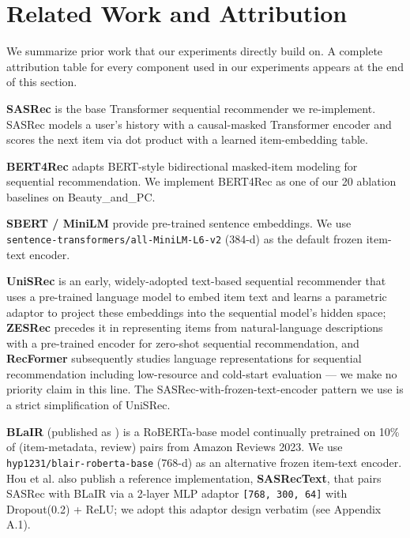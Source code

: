 \section{Related Work and Attribution}\label{sec:2}

We summarize prior work that our experiments directly build on. A complete attribution table for every component used in our experiments appears at the end of this section.

\textbf{SASRec} \citep{kang2018sasrec} is the base Transformer sequential recommender we re-implement. SASRec models a user's history with a causal-masked Transformer encoder and scores the next item via dot product with a learned item-embedding table.

\textbf{BERT4Rec} \citep{sun2019bert4rec} adapts BERT-style bidirectional masked-item modeling for sequential recommendation. We implement BERT4Rec as one of our 20 ablation baselines on Beauty\_and\_\allowbreak PC.

\textbf{SBERT / MiniLM} \citep{reimers2019sbert,wang2020minilm} provide pre-trained sentence embeddings. We use \texttt{sentence-transformers/}\allowbreak\texttt{all-MiniLM-L6-v2} \citep{minilm2021card} (384-d) as the default frozen item-text encoder.

\textbf{UniSRec} \citep{hou2022unisrec} is an early, widely-adopted text-based sequential recommender that uses a pre-trained language model to embed item text and learns a parametric adaptor to project these embeddings into the sequential model's hidden space; \textbf{ZESRec} \citep{ding2021zesrec} precedes it in representing items from natural-language descriptions with a pre-trained encoder for zero-shot sequential recommendation, and \textbf{RecFormer} \citep{li2023recformer} subsequently studies language representations for sequential recommendation including low-resource and cold-start evaluation --- we make no priority claim in this line. The SASRec-with-frozen-text-encoder pattern we use is a strict simplification of UniSRec.

\textbf{BLaIR} \citep{hou2024blair} (published as \citealp{hou2026blairacl}) is a RoBERTa-base model continually pretrained on 10\% of (item-metadata, review) pairs from Amazon Reviews 2023. We use \texttt{hyp1231/blair-roberta-base} (768-d) as an alternative frozen item-text encoder. Hou et al. also publish a reference implementation, \textbf{SASRecText}, that pairs SASRec with BLaIR via a 2-layer MLP adaptor \texttt{{[}768,\ 300,\ 64{]}} with Dropout(0.2) + ReLU; we adopt this adaptor design verbatim (see Appendix A.1).

